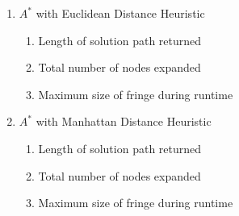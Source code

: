 \documentclass[letter]{article}
\begin{document}
\begin{enumerate}[resume]
\begin{enumerate}
			\item {$ A^* $ with Euclidean Distance Heuristic} 
			\begin{enumerate}
				\item {Length of solution path returned} 
				\item {Total number of nodes expanded} 
				\item {Maximum size of fringe during runtime}
			\end{enumerate}
			
			\item {$ A^* $ with Manhattan Distance Heuristic} 
			\begin{enumerate}
				\item {Length of solution path returned} 
				\item {Total number of nodes expanded} 
				\item {Maximum size of fringe during runtime}
			\end{enumerate}
		\end{enumerate}
	\end{enumerate}
\end{document}
